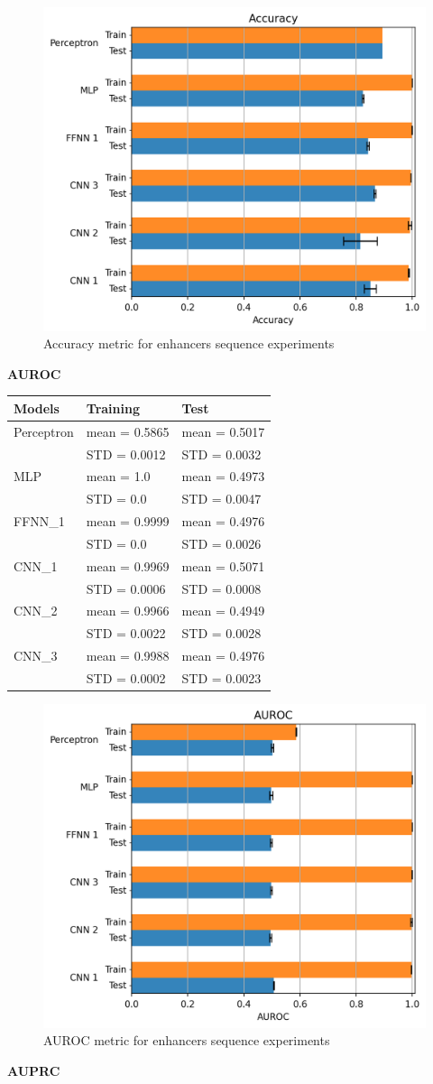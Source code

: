 \begin{figure}[h!]
\centering
\includegraphics[width=0.82\linewidth]{../images/sequence_results/enhancers/accuracy.png}
\caption{Accuracy metric for enhancers sequence experiments}
\end{figure}
\newpage
\textbf{AUROC}

\begin{longtable}[]{@{}lll@{}}
\toprule
\textbf{Models} & \textbf{Training} & \textbf{Test}\tabularnewline
\midrule
\endhead
Perceptron & mean = 0.5865 & mean = 0.5017\tabularnewline
& STD = 0.0012 & STD = 0.0032\tabularnewline
MLP & mean = 1.0 & mean = 0.4973\tabularnewline
& STD = 0.0 & STD = 0.0047\tabularnewline
FFNN\_1 & mean = 0.9999 & mean = 0.4976\tabularnewline
& STD = 0.0 & STD = 0.0026\tabularnewline
CNN\_1 & mean = 0.9969 & mean = 0.5071\tabularnewline
& STD = 0.0006 & STD = 0.0008\tabularnewline
CNN\_2 & mean = 0.9966 & mean = 0.4949\tabularnewline
& STD = 0.0022 & STD = 0.0028\tabularnewline
CNN\_3 & mean = 0.9988 & mean = 0.4976\tabularnewline
& STD = 0.0002 & STD = 0.0023\tabularnewline
\bottomrule
\end{longtable}

\begin{figure}[h!]
\centering
\includegraphics[width=0.8\linewidth]{../images/sequence_results/enhancers/auroc.png}
\caption{AUROC metric for enhancers sequence experiments}
\end{figure}
\newpage
\textbf{AUPRC}

